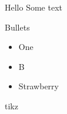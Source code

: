 \documentclass{beamer}
\begin{document}
	
	\begin{frame}{Hello}
		Some text
	\end{frame}

	\begin{frame}{Bullets}
		\begin{itemize}
			\item One
			\item B
			\item Strawberry
		\end{itemize}
	\end{frame}

	\begin{frame}{tikz}
	\end{frame}
\end{document}
